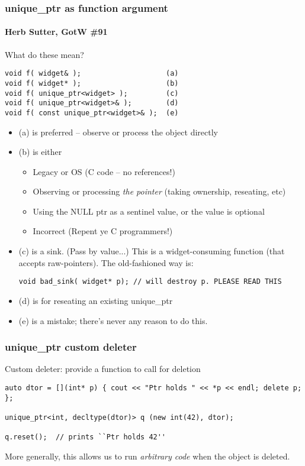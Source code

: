 \begin{frame}[fragile]
\frametitle{unique\_ptr as function argument}
\framesubtitle{Herb Sutter, GotW \#91}
What do these mean?
{\scriptsize\begin{verbatim}
void f( widget& );                    (a)
void f( widget* );                    (b)
void f( unique_ptr<widget> );         (c)
void f( unique_ptr<widget>& );        (d)
void f( const unique_ptr<widget>& );  (e)
\end{verbatim}
}
\begin{itemize}
\pause{}
\item (a) is preferred -- observe or process the object directly
\pause{}
\item (b) is either
\begin{itemize}
  \item Legacy or OS (C code -- no references!)
  \item Observing or processing \emph{the pointer} (taking ownership,
    reseating, etc)
  \item Using the NULL ptr as a sentinel value, or the value is optional
  \item Incorrect (Repent ye C programmers!)
\end{itemize}
\pause{}
\item (c) is a sink.  (Pass by value...) This is a widget-consuming
  function (that accepts raw-pointers).  The old-fashioned way is:
{\scriptsize\begin{verbatim}
void bad_sink( widget* p); // will destroy p. PLEASE READ THIS
\end{verbatim}
}
\pause{}
\item (d) is for reseating an existing unique\_ptr 
\pause{}
\item (e) is a mistake; there's never any reason to do this.
\end{itemize}
\end{frame}


\begin{frame}[fragile]
\frametitle{unique\_ptr custom deleter}
Custom deleter: provide a function to call for deletion
{\scriptsize\begin{verbatim}
auto dtor = [](int* p) { cout << "Ptr holds " << *p << endl; delete p; };

unique_ptr<int, decltype(dtor)> q (new int(42), dtor);

q.reset();  // prints ``Ptr holds 42''
\end{verbatim}}


\vskip 12pt

More generally, this allows us to run \emph{arbitrary code} when the
object is deleted.


\end{frame}

